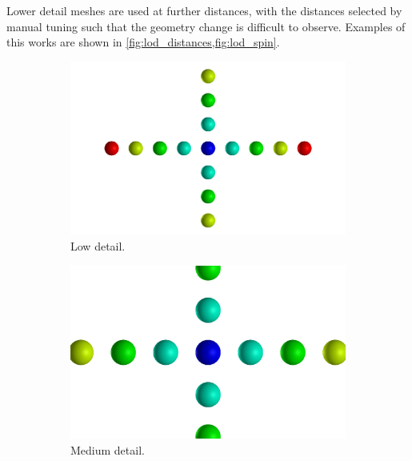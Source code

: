 Lower detail meshes are used at further distances, with the distances selected by manual tuning such that the geometry change is difficult to observe. Examples of this works are shown in \cref{fig:lod_distances,fig:lod_spin}.
\begin{figure}
  \begin{center}
    \begin{subfigure}{0.3\textwidth}
      \includegraphics[width=\textwidth]{assets/images/lod/1}
      \caption{Low detail.}
      \label{fig:lod_1}
    \end{subfigure}
    \begin{subfigure}{0.3\textwidth}
      \includegraphics[width=\textwidth]{assets/images/lod/2}
      \caption{Medium detail.}
      \label{fig:lod_2}
    \end{subfigure}
    \begin{subfigure}{0.3\textwidth}

\end{subfigure}
\end{center}
\end{figure}
